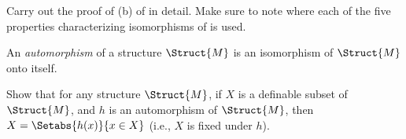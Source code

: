 \documentclass[../../../include/open-logic-section]{subfiles}
\begin{document}
\begin{prob}
Carry out the proof of (b) of  in
detail. Make sure to note where each of the five properties
characterizing isomorphisms of 
is used.
\end{prob}

\begin{defn}
An \emph{automorphism} of a structure $\Struct{M}$ is an isomorphism
of $\Struct{M}$ onto itself.
\end{defn}

\begin{prob}
Show that for any structure $\Struct{M}$, if $X$ is a definable subset
of $\Struct{M}$, and $h$ is an automorphism of $\Struct{M}$, then $X
= \Setabs{h(x)}{x \in X}$ (i.e., $X$ is fixed under $h$).
\end{prob}
\end{document}
